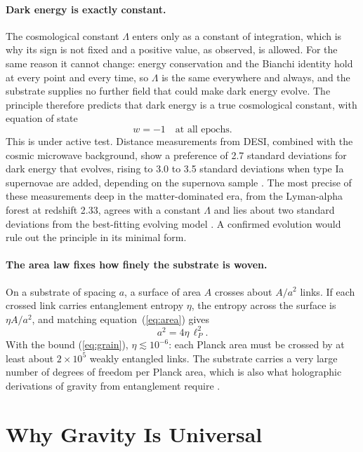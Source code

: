 \documentclass[aps,prd,onecolumn,nofootinbib,superscriptaddress]{revtex4-2}
\begin{document}
\paragraph{Dark energy is exactly constant.} The cosmological constant $\Lambda$ enters only as a constant of integration, which is why its sign is not fixed and a positive value, as observed, is allowed. For the same reason it cannot change: energy conservation and the Bianchi identity hold at every point and every time, so $\Lambda$ is the same everywhere and always, and the substrate supplies no further field that could make dark energy evolve. The principle therefore predicts that dark energy is a true cosmological constant, with equation of state
\begin{equation}
w = -1 \quad \text{at all epochs.}
\end{equation}
This is under active test. Distance measurements from DESI, combined with the cosmic microwave background, show a preference of 2.7 standard deviations for dark energy that evolves, rising to 3.0 to 3.5 standard deviations when type Ia supernovae are added, depending on the supernova sample \cite{desi2025, desi2026}. The most precise of these measurements deep in the matter-dominated era, from the Lyman-alpha forest at redshift 2.33, agrees with a constant $\Lambda$ and lies about two standard deviations from the best-fitting evolving model \cite{desi2026}. A confirmed evolution would rule out the principle in its minimal form.

\paragraph{The area law fixes how finely the substrate is woven.} On a substrate of spacing $a$, a surface of area $A$ crosses about $A/a^2$ links. If each crossed link carries entanglement entropy $\eta$, the entropy across the surface is $\eta A/a^2$, and matching equation~(\ref{eq:area}) gives
\begin{equation}
a^2 = 4\eta\,\ell_P^2 .
\end{equation}
With the bound (\ref{eq:grain}), $\eta \lesssim 10^{-6}$: each Planck area must be crossed by at least about $2\times10^{5}$ weakly entangled links. The substrate carries a very large number of degrees of freedom per Planck area, which is also what holographic derivations of gravity from entanglement require \cite{faulkner2014}.

\section{Why Gravity Is Universal}
\label{sec:universal}
\end{document}
